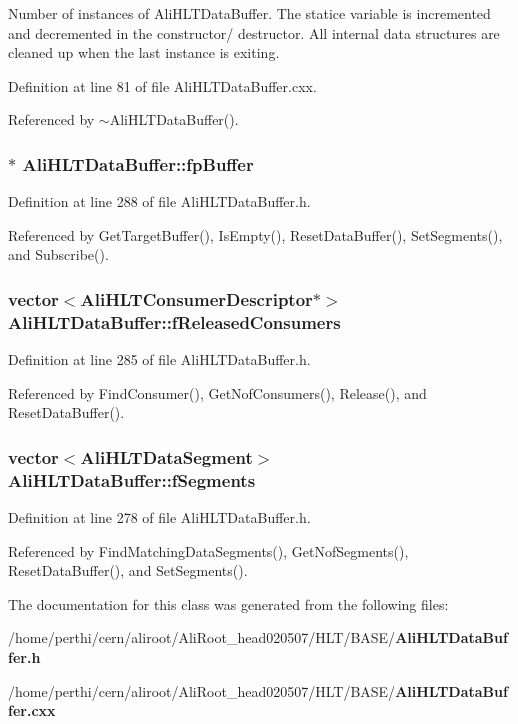 Number of instances of Ali\-HLTData\-Buffer. The statice variable is incremented and decremented in the constructor/ destructor. All internal data structures are cleaned up when the last instance is exiting. 

Definition at line 81 of file Ali\-HLTData\-Buffer.cxx.

Referenced by $\sim$Ali\-HLTData\-Buffer().
\subsubsection{$\ast$ {\bf Ali\-HLTData\-Buffer::fp\-Buffer}\hspace{0.3cm}{\tt  [private]}}\label{classAliHLTDataBuffer_r4}




Definition at line 288 of file Ali\-HLTData\-Buffer.h.

Referenced by Get\-Target\-Buffer(), Is\-Empty(), Reset\-Data\-Buffer(), Set\-Segments(), and Subscribe().
\subsubsection{\setlength{\rightskip}{0pt plus 5cm}vector$<${\bf Ali\-HLTConsumer\-Descriptor}$\ast$$>$ {\bf Ali\-HLTData\-Buffer::f\-Released\-Consumers}\hspace{0.3cm}{\tt  [private]}}\label{classAliHLTDataBuffer_r3}




Definition at line 285 of file Ali\-HLTData\-Buffer.h.

Referenced by Find\-Consumer(), Get\-Nof\-Consumers(), Release(), and Reset\-Data\-Buffer().
\subsubsection{\setlength{\rightskip}{0pt plus 5cm}vector$<${\bf Ali\-HLTData\-Segment}$>$ {\bf Ali\-HLTData\-Buffer::f\-Segments}\hspace{0.3cm}{\tt  [private]}}\label{classAliHLTDataBuffer_r0}




Definition at line 278 of file Ali\-HLTData\-Buffer.h.

Referenced by Find\-Matching\-Data\-Segments(), Get\-Nof\-Segments(), Reset\-Data\-Buffer(), and Set\-Segments().

The documentation for this class was generated from the following files:\begin{CompactItemize}
\item 
/home/perthi/cern/aliroot/Ali\-Root\_\-head020507/HLT/BASE/{\bf Ali\-HLTData\-Buffer.h}\item 
/home/perthi/cern/aliroot/Ali\-Root\_\-head020507/HLT/BASE/{\bf Ali\-HLTData\-Buffer.cxx}\end{CompactItemize}
